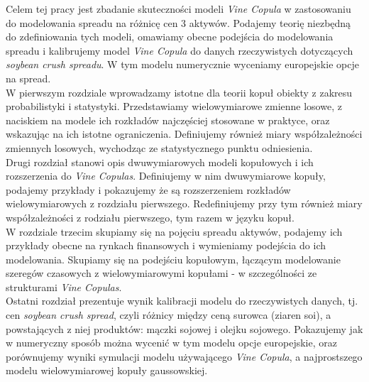 \begin{wstep}[Wprowadzenie]
	Celem tej pracy jest zbadanie skuteczności modeli \emph{Vine Copula} w zastosowaniu do modelowania spreadu na różnicę cen 3 aktywów. Podajemy teorię niezbędną do zdefiniowania tych modeli, omawiamy obecne podejścia do modelowania spreadu i kalibrujemy model \emph{Vine Copula} do danych rzeczywistych dotyczących \emph{soybean crush spreadu}. W tym modelu numerycznie wyceniamy europejskie opcje na spread.\\
	
	W pierwszym rozdziale wprowadzamy istotne dla teorii kopuł obiekty z zakresu probabilistyki i statystyki. Przedstawiamy wielowymiarowe zmienne losowe, z naciskiem na modele ich rozkładów najczęściej stosowane w praktyce, oraz wskazując na ich istotne ograniczenia. Definiujemy również miary współzależności zmiennych losowych, wychodząc ze statystycznego punktu odniesienia.\\
	
	Drugi rozdział stanowi opis dwuwymiarowych modeli kopułowych i ich rozszerzenia do \emph{Vine Copulas}. Definiujemy w nim dwuwymiarowe kopuły, podajemy przykłady i pokazujemy że są rozszerzeniem rozkładów wielowymiarowych z rozdziału pierwszego. Redefiniujemy przy tym również miary współzależności z rodziału pierwszego, tym razem w języku kopuł.\\
	
	W rozdziale trzecim skupiamy się na pojęciu spreadu aktywów, podajemy ich przykłady obecne na rynkach finansowych i wymieniamy podejścia do ich modelowania. Skupiamy się na podejściu kopułowym, łączącym modelowanie szeregów czasowych z wielowymiarowymi kopułami - w szczególności ze strukturami \emph{Vine Copulas}.\\
	
	Ostatni rozdział prezentuje wynik kalibracji modelu do rzeczywistych danych, tj. cen \emph{soybean crush spread}, czyli różnicy między ceną surowca (ziaren soi), a powstających z niej produktów: mączki sojowej i olejku sojowego. Pokazujemy jak w numeryczny sposób można wycenić w tym modelu opcje europejskie, oraz porównujemy wyniki symulacji modelu używającego \emph{Vine Copula}, a najprostszego modelu wielowymiarowej kopuły gaussowskiej.
	
\end{wstep}
